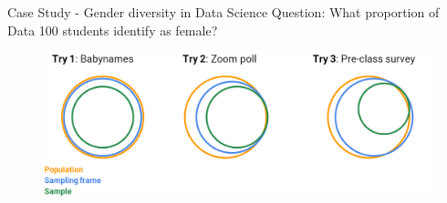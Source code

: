 \documentclass[aspectratio=169]{../latex_main/tntbeamer}  %
\begin{document}
	
	\begin{frame}{Case Study - Gender diversity in Data Science}
	   Question: What proportion of Data 100 students identify as female?
	   \begin{figure}
	       \centering
	       \includegraphics[scale=.4]{Bild9}
	   \end{figure}
	    
	\end{frame}
\end{document}
